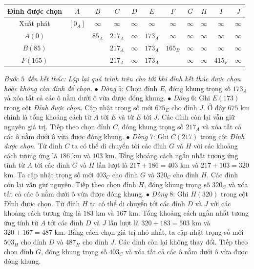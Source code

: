 \begin{multicols}{2}
\begin{table}[H]
{\begin{tabular}{|c|c|c|c|c|c|c|c|c|c|c|}
			\hline
			Đỉnh được chọn&$A$&	$B$&	$C$&	$D$&	$E$&	$F$&	$G$&	$H$&	$I$&	$J$\\
			\hline
			Xuất phát&	$[0_A ]$	&$\infty$&	$\infty$&	$\infty$	&$\infty$	&$\infty$&	$\infty$&	$\infty$&	$\infty$	&$\infty$\\
			\hline
			$A(0)$&		&$85_A$	&$217_A$&	$\infty$	&$173_A$&	$\infty$&	$\infty$&	$\infty$&	$\infty$&	$\infty$\\
			\hline
			$B(85)$	&	&	&$217_A$&	$\infty$&	$173_A$&	$165_B$&	$\infty$	&$\infty$&	$\infty$	&$\infty$\\
			\hline
			$F(165)$&	&	&	$217_A$&	$\infty$	&$173_A$	&	&$\infty$&	$\infty$&	$415_F$	&$\infty$\\
			\hline
		\end{tabular}}
		\vspace*{-10pt}
	\end{table}
	\textit{Bước $5$ đến kết thúc: Lặp lại quá trình trên cho tới khi đỉnh kết thúc được chọn hoặc không còn đỉnh để chọn.}
	\vskip 0.1cm 
	$\bullet$ \textit{Dòng} $5$: Chọn đỉnh $E$, đóng khung trọng số $173_A$ và xóa tất cả các ô nằm dưới ô vừa được đóng khung. 
	\vskip 0.1cm
	$\bullet$ \textit{Dòng} $6$: Ghi $E(173)$ trong cột \textit{Đỉnh được chọn}. Cập nhật trọng số mới $675_E$ cho đỉnh $J$. Ở đây $675$ km chính là tổng khoảng cách từ $A$ tới $E$ và từ $E$ tới $J$. Các đỉnh còn lại vẫn giữ nguyên giá trị. Tiếp theo chọn đỉnh $C$, đóng khung trọng số $217_A$ và xóa tất cả các ô nằm dưới ô vừa được đóng khung.
	\vskip 0.1cm 
	$\bullet$ \textit{Dòng} $7$: Ghi $C(217)$ trong cột \textit{Đỉnh được chọn}. Từ đỉnh $C$ ta có thể di chuyển tới các đỉnh $G$ và $H$ với các khoảng cách tương ứng là $186$ km và $103$ km. Tổng khoảng cách ngắn nhất tương ứng tính từ $A$ tới các đỉnh $G$ và $H$ lần lượt là $217+186=403$ km và $217+103=320$ km. Ta cập nhật trọng số mới $403_C$ cho đỉnh $G$ và $320_C$ cho đỉnh $H$. Các đỉnh còn lại vẫn giữ nguyên. Tiếp theo chọn đỉnh $H$, đóng khung trọng số $320_C$ và xóa tất cả các ô nằm dưới ô vừa được đóng khung.
	\vskip 0.1cm
	$\bullet$ \textit{Dòng} $8$: Ghi $H(320)$ trong cột Đỉnh được chọn. Từ đỉnh $H$ ta có thể di chuyển tới các đỉnh $D$ và $J$ với các khoảng cách tương ứng là $183$ km và $167$ km. Tổng khoảng cách ngắn nhất tương ứng tính từ $A$ tới các đỉnh $D$ và $J$ lần lượt là $320+183=503$ km và $320+167=487$ km. Bằng cách chọn giá trị nhỏ nhất, ta cập nhật trọng số mới $503_H$ cho đỉnh $D$ và $487_H$ cho đỉnh $J$. Các đỉnh còn lại không thay đổi. Tiếp theo chọn đỉnh $G$, đóng khung trọng số $403_C$ và xóa tất cả các ô nằm dưới ô vừa được đóng khung.

\end{multicols}

